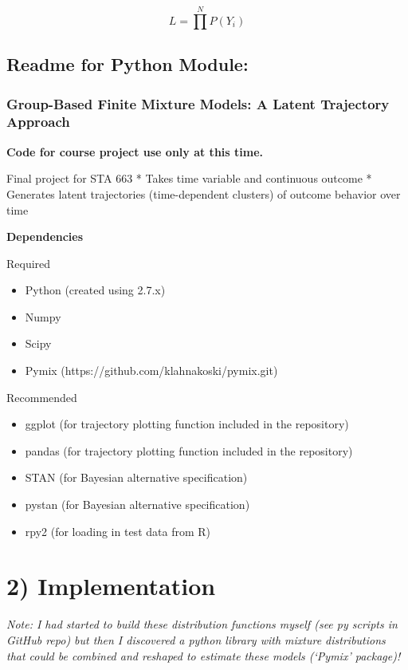 \documentclass{article}
\begin{document}
\[L = \prod^N P(Y_i)\tag{2}\]

    \subsection{Readme for Python Module:}\label{readme-for-python-module}

\subsubsection{Group-Based Finite Mixture Models: A Latent Trajectory
Approach}\label{group-based-finite-mixture-models-a-latent-trajectory-approach}

\textbf{Code for course project use only at this time.}

Final project for STA 663 * Takes time variable and continuous outcome *
Generates latent trajectories (time-dependent clusters) of outcome
behavior over time

\textbf{Dependencies}

Required

\begin{itemize}
\itemsep1pt\parskip0pt
\item
  Python (created using 2.7.x)
\item
  Numpy
\item
  Scipy
\item
  Pymix (https://github.com/klahnakoski/pymix.git)
\end{itemize}

Recommended

\begin{itemize}
\itemsep1pt\parskip0pt
\item
  ggplot (for trajectory plotting function included in the repository)
\item
  pandas (for trajectory plotting function included in the repository)
\item
  STAN (for Bayesian alternative specification)
\item
  pystan (for Bayesian alternative specification)
\item
  rpy2 (for loading in test data from R)
\end{itemize}

    \section{2) Implementation}\label{implementation}

    \emph{Note: I had started to build these distribution functions myself
(see py scripts in GitHub repo) but then I discovered a python library
with mixture distributions that could be combined and reshaped to
estimate these models (`Pymix' package)!}
\end{document}
